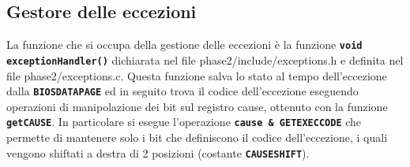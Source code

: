 \documentclass{article}
\begin{document}
	\newpage
	\subsection{Gestore delle eccezioni}
	La funzione che si occupa della gestione delle eccezioni è la funzione \texttt{\textbf{void
	exceptionHandler()}} dichiarata nel file phase2/include/exceptions.h e
	definita nel file phase2/exceptions.c. Questa funzione salva lo stato al tempo
	dell'eccezione dalla \texttt{\textbf{BIOSDATAPAGE}} ed in seguito trova il
	codice dell'eccezione eseguendo operazioni di manipolazione dei bit sul
	registro cause, ottenuto con la funzione \texttt{\textbf{getCAUSE}}. In particolare
	si esegue l'operazione \texttt{\textbf{cause \& GETEXECCODE}} che permette di
	mantenere solo i bit che definiscono il codice dell'eccezione, i quali vengono
	shiftati a destra di 2 posizioni (costante \texttt{\textbf{CAUSESHIFT}}).
\end{document}
